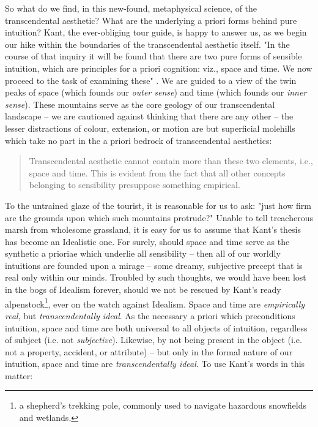 So what do we find, in this new-found, metaphysical science, of the transcendental aesthetic? What are the underlying a priori forms behind pure intuition? Kant, the ever-obliging tour guide, is happy to answer us, as we begin our hike within the boundaries of the transcendental aesthetic itself. "In the course of that inquiry it will be found that there are two pure forms of sensible intuition, which are principles for a priori cognition: viz., space and time. We now proceed to the task of examining these" \autocite[B37]{hackett}. We are guided to a view of the twin peaks of space (which founds our \emph{outer sense}) and time (which founds our \emph{inner sense}). These mountains serve as the core geology of our transcendental landscape -- we are cautioned against thinking that there are any other -- the lesser distractions of colour, extension, or motion are but superficial molehills which take no part in the a priori bedrock of transcendental aesthetics:

\begin{quote}
  Transcendental aesthetic cannot contain more than these two elements, i.e., space and time. This is evident from the fact that all other concepts belonging to sensibility presuppose something empirical.

  \autocite[B58]{hackett}
\end{quote}

To the untrained glaze of the tourist, it is reasonable for us to ask: "just how firm are the grounds upon which such mountains protrude?" Unable to tell treacherous marsh from wholesome grassland, it is easy for us to assume that Kant's thesis has become an Idealistic one. For surely, should space and time serve as the synthetic a prioriae which underlie all sensibility -- then all of our worldly intuitions are founded upon a mirage -- some dreamy, subjective precept that is real only within our minds. Troubled by such thoughts, we would have been lost in the bogs of Idealism forever, should we not be rescued by Kant's ready alpenstock\footnote{a shepherd’s trekking pole, commonly used to navigate hazardous snowfields and wetlands.}, ever on the watch against Idealism. Space and time are \emph{empirically real}, but \emph{transcendentally ideal}. As the necessary a priori which preconditions intuition, space and time are both universal to all objects of intuition, regardless of subject (i.e. not \emph{subjective}). Likewise, by not being present in the object (i.e. not a property, accident, or attribute) -- but only in the formal nature of our intuition, space and time are \emph{transcendentally ideal}. To use Kant's words in this matter:

